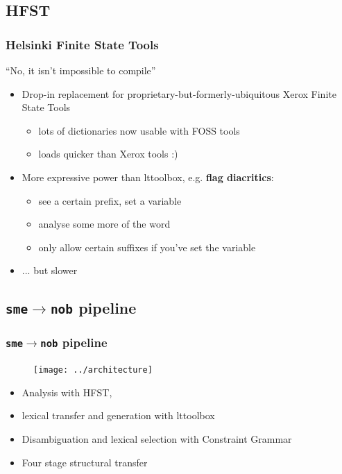 \documentclass[notes=hide]{beamer}
\newcommand{\sme}{{\tt sme}}
\newcommand{\nob}{{\tt nob}}
\newcommand{\smenob}{\sme$\rightarrow{}$\nob}
\begin{document}
\subsection{HFST}
\begin{frame}\frametitle{Helsinki Finite State Tools}
  \begin{center}
    ``No, it isn't impossible to compile''
  \end{center}
  \begin{itemize}
  \item Drop-in replacement for proprietary-but-formerly-ubiquitous
    Xerox Finite State Tools
    \begin{itemize}
    \item lots of dictionaries now usable with FOSS tools
    \item loads quicker than Xerox tools :)
    \end{itemize}
  \end{itemize}

  \begin{itemize}
  \item More expressive power than lttoolbox, e.g. \textbf{flag
      diacritics}:
    \begin{itemize}
    \item see a certain prefix, set a variable
    \item analyse some more of the word
    \item only allow certain suffixes if you've set the variable
    \end{itemize}
  \item ... but slower          %
  \end{itemize}
\end{frame}

\subsection{\smenob{} pipeline}
\begin{frame}\frametitle{\smenob{} pipeline}
    \begin{figure}
    \begin{center}
      \texttt{[image: ../architecture]}
    \end{center}
    \label{fig:modules}
  \end{figure}

    \textheight
  \begin{itemize}
  \item Analysis with HFST,
  \item lexical transfer and generation with lttoolbox
  \end{itemize}
  \begin{itemize}
  \item Disambiguation and lexical selection with Constraint
    Grammar
  \end{itemize}
  \begin{itemize}
  \item Four stage structural transfer
  \end{itemize}
\end{frame}
\end{document}
